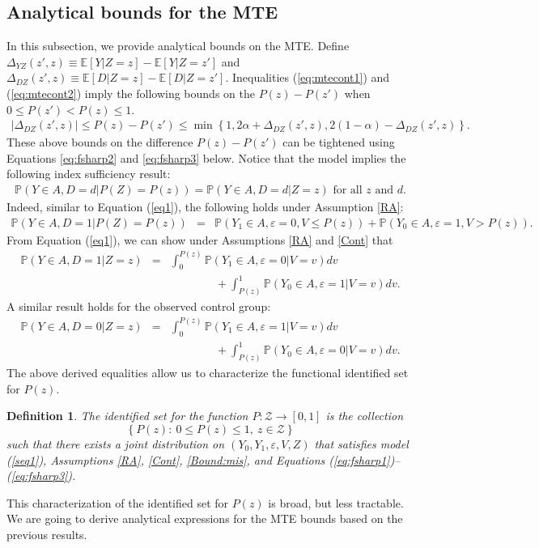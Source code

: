 \documentclass[11pt,reqno]{amsart}
\theoremstyle{plain}
\newtheorem{definition}{Definition}
\numberwithin{equation}{section}
\begin{document}
\subsection{Analytical bounds for the MTE}\label{anabounds}
In this subsection, we provide analytical bounds on the MTE. 
Define $\Delta_{YZ}(z',z)\equiv \mathbb E[Y\vert Z=z]-\mathbb E[Y\vert Z=z']$ and $\Delta_{DZ}(z',z)\equiv \mathbb E[D\vert Z=z]-\mathbb E[D\vert Z=z']$. Inequalities (\ref{eq:mtecont1}) and (\ref{eq:mtecont2}) imply the following bounds on the $P(z)-P(z')$ when $0\leq P(z') < P(z)\leq 1$.
\begin{eqnarray*}
\left \lvert \Delta_{DZ}(z',z)\right \rvert \leq P(z)-P(z') \leq \min\left\{1,2\alpha+\Delta_{DZ}(z',z), 2(1-\alpha)-\Delta_{DZ}(z',z)\right\}. 
\end{eqnarray*}
These above bounds on the difference $P(z)-P(z')$ can be tightened using Equations \eqref{eq:fsharp2} and \eqref{eq:fsharp3} below. 
Notice that the model implies the following index sufficiency result:
\begin{eqnarray}
\mathbb P\left(Y\in A, D=d\vert P(Z)=P(z)\right)=\mathbb P\left(Y\in A, D=d\vert Z=z\right) \text{ for all  $z$ and $d$.} \label{eq:fsharp1}
\end{eqnarray} 
Indeed, similar to Equation (\ref{eq1}), the following holds under Assumption \ref{RA}:
\begin{eqnarray*}
\mathbb P(Y\in A, D=1 \vert P(Z)=P(z)) &=& \mathbb P(Y_1\in A, \varepsilon=0, V \leq P(z)) + \mathbb P(Y_0\in A, \varepsilon=1, V > P(z)).
\end{eqnarray*}
From Equation (\ref{eq1}), we can show under Assumptions \ref{RA} and \ref{Cont} that 
\begin{eqnarray}
\mathbb P(Y\in A, D=1 \vert Z=z) 
&=& \int^{P(z)}_0\mathbb P\left(Y_1\in A, \varepsilon=0 \vert V=v\right)dv \nonumber \\
&& \qquad \qquad + \int_{P(z)}^1\mathbb P\left(Y_0\in A, \varepsilon=1 \vert V=v\right)dv. \label{eq:fsharp2}
\end{eqnarray}
A similar result holds for the observed control group:
\begin{eqnarray}
\mathbb P(Y\in A, D=0 \vert Z=z) &=& \int^{P(z)}_0\mathbb P\left(Y_1\in A, \varepsilon=1 \vert V=v\right)dv \nonumber \\
&& \qquad \qquad + \int_{P(z)}^1\mathbb P\left(Y_0\in A, \varepsilon=0 \vert V=v\right)dv. \label{eq:fsharp3}
\end{eqnarray}
The above derived equalities allow us to characterize the functional identified set for $P(z)$.
\begin{definition}
The identified set for the function $P: \mathcal Z \rightarrow [0,1]$ is the collection $$\left\{P(z): \ 0\leq P(z) \leq 1,\ z \in \mathcal Z\right\}$$ such that there exists a joint distribution on $(Y_0, Y_1, \varepsilon, V, Z)$ that satisfies model (\ref{seq1}),  Assumptions \ref{RA}, \ref{Cont}, \ref{Bound:mis}, and Equations (\ref{eq:fsharp1})--(\ref{eq:fsharp3}).
\end{definition}
This characterization of the identified set for $P(z)$ is broad, but less tractable. We are going to derive analytical expressions for the MTE bounds based on the previous results. 
\end{document}
